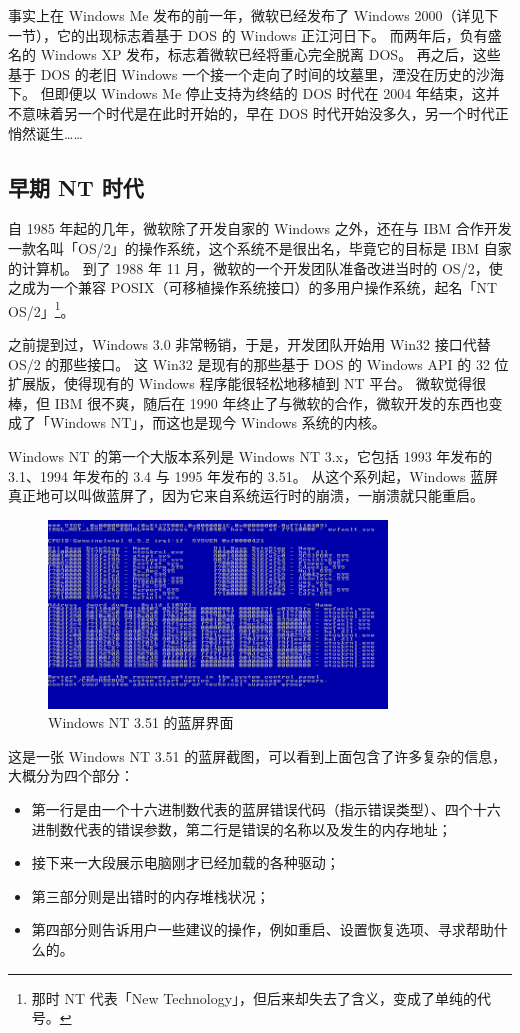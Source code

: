 事实上在 Windows Me 发布的前一年，微软已经发布了 Windows 2000（详见下一节），它的出现标志着基于 DOS 的 Windows 正江河日下。
而两年后，负有盛名的 Windows XP 发布，标志着微软已经将重心完全脱离 DOS。
再之后，这些基于 DOS 的老旧 Windows 一个接一个走向了时间的坟墓里，湮没在历史的沙海下。
但即便以 Windows Me 停止支持为终结的 DOS 时代在 2004 年结束，这并不意味着另一个时代是在此时开始的，早在 DOS 时代开始没多久，另一个时代正悄然诞生……

\subsection{早期 NT 时代}

自 1985 年起的几年，微软除了开发自家的 Windows 之外，还在与 IBM 合作开发一款名叫「OS/2」的操作系统，这个系统不是很出名，毕竟它的目标是 IBM 自家的计算机。
到了 1988 年 11 月，微软的一个开发团队准备改进当时的 OS/2，使之成为一个兼容 POSIX（可移植操作系统接口）的多用户操作系统，起名「NT OS/2」\footnote{那时 NT 代表「New Technology」，但后来却失去了含义，变成了单纯的代号。}。

之前提到过，Windows 3.0 非常畅销，于是，开发团队开始用 Win32 接口代替 OS/2 的那些接口。
这 Win32 是现有的那些基于 DOS 的 Windows API 的 32 位扩展版，使得现有的 Windows 程序能很轻松地移植到 NT 平台。
微软觉得很棒，但 IBM 很不爽，随后在 1990 年终止了与微软的合作，微软开发的东西也变成了「Windows NT」，而这也是现今 Windows 系统的内核。

Windows NT 的第一个大版本系列是 Windows NT 3.x，它包括 1993 年发布的 3.1、1994 年发布的 3.4 与 1995 年发布的 3.51。
从这个系列起，Windows 蓝屏真正地可以叫做蓝屏了，因为它来自系统运行时的崩溃，一崩溃就只能重启。

\begin{figure}[htb!]
  \centering
  \includegraphics[width=9cm]{assets/Win-NT-3.51-BSoD.png}
  \caption{Windows NT 3.51 的蓝屏界面}
  \label{Win-NT-3.51-BSoD}
\end{figure}

这是一张 Windows NT 3.51 的蓝屏截图，可以看到上面包含了许多复杂的信息，大概分为四个部分：
\begin{itemize}
  \item 第一行是由一个十六进制数代表的蓝屏错误代码（指示错误类型）、四个十六进制数代表的错误参数，第二行是错误的名称以及发生的内存地址；
  \item 接下来一大段展示电脑刚才已经加载的各种驱动；
  \item 第三部分则是出错时的内存堆栈状况；
  \item 第四部分则告诉用户一些建议的操作，例如重启、设置恢复选项、寻求帮助什么的。
\end{itemize}

